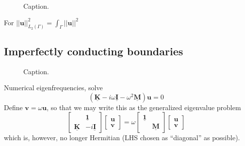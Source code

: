 \documentclass[11pt, a4paper]{article}
\begin{document}
\begin{figure}[ht]
    \centering
    
    \caption{Caption.}
    \label{fig:rectangular-cavity-suppression}
\end{figure}


For $||\mathbf{u}||_{L_2(\Gamma)}^2 = \int_{\Gamma} ||\mathbf{u}||^2$

\subsection{Imperfectly conducting boundaries}
\label{subsec:examples-impedance}
\begin{figure}[ht]
    \centering
    
    \caption{Caption.}
    \label{fig:imperfect-conductor-norms}
\end{figure}

Numerical eigenfrequencies, solve
\begin{equation}
    (\mathbf{\underline{K}} - i \omega \mathbf{\underline{I}} - \omega^2 \mathbf{\underline{M}}) \mathbf{u} = 0
\end{equation}
Define $\mathbf{v} = \omega \mathbf{u}$, so that we may write this as the
generalized eigenvalue problem
\begin{equation}
    \begin{bmatrix}
         & \boldsymbol{\underline{1}} \\
        \mathbf{\underline{K}} & -i \mathbf{\underline{I}}
    \end{bmatrix}
    \begin{bmatrix}
        \mathbf{u} \\
        \mathbf{v}
    \end{bmatrix}
    =
    \omega
    \begin{bmatrix}
        \boldsymbol{\underline{1}} & \\
         & \boldsymbol{\underline{M}}
    \end{bmatrix}
    \begin{bmatrix}
        \mathbf{u} \\
        \mathbf{v}
    \end{bmatrix}
\end{equation}
which is, however, no longer Hermitian (LHS chosen as \enquote{diagonal} as possible).
\end{document}
